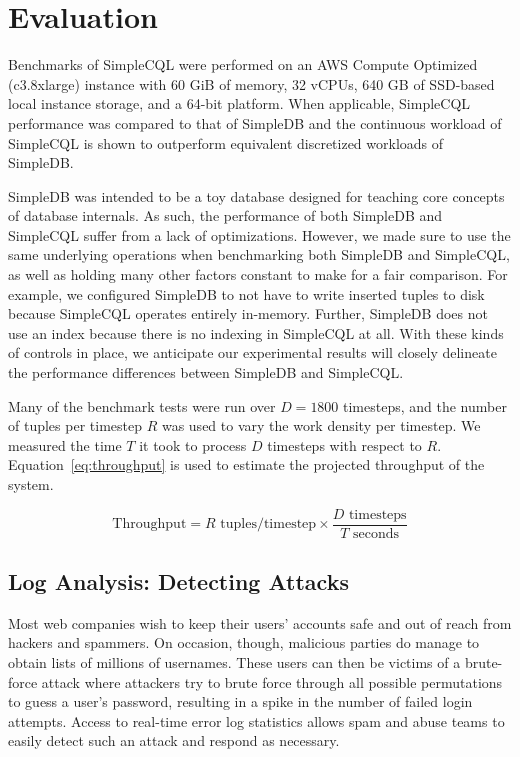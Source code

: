 \documentclass[a4paper, 10pt, conference]{IEEEconf}
\begin{document}
\section{Evaluation}
Benchmarks of SimpleCQL were performed on an AWS Compute Optimized (c3.8xlarge) instance with 60 GiB of memory, 32 vCPUs, 640 GB of SSD-based local instance storage, and a 64-bit platform.  When applicable, SimpleCQL performance was compared to that of SimpleDB and the continuous workload of SimpleCQL is shown to outperform equivalent discretized workloads of SimpleDB.  

SimpleDB was intended to be a toy database designed for teaching core concepts of database internals.  As such, the performance of both SimpleDB and SimpleCQL suffer from a lack of optimizations.  However, we made sure to use the same underlying operations when benchmarking both SimpleDB and SimpleCQL, as well as holding many other factors constant to make for a fair comparison. For example, we configured SimpleDB to not have to write inserted tuples to disk because SimpleCQL operates entirely in-memory. Further, SimpleDB does not use an index because there is no indexing in SimpleCQL at all. With these kinds of controls in place, we anticipate our experimental results will closely delineate the performance differences between SimpleDB and SimpleCQL.

Many of the benchmark tests were run over $D = 1800$ timesteps, and the number of tuples per timestep $R$ was used to vary the work density per timestep.  We measured the time $T$ it took to process $D$ timesteps with respect to $R$.  Equation~\ref{eq:throughput} is used to estimate the projected throughput of the system.

$$
    \text{Throughput} = R \text{ tuples/timestep} \times \dfrac{D \text{ timesteps}}{T \text{ seconds}}
$$

\subsection{Log Analysis: Detecting Attacks}
Most web companies wish to keep their users' accounts safe and out of reach from hackers and spammers.  On occasion, though, malicious parties do manage to obtain lists of millions of usernames.  These users can then be victims of a brute-force attack where attackers try to brute force through all possible permutations to guess a user's password, resulting in a spike in the number of failed login attempts. Access to real-time error log statistics allows spam and abuse teams to easily detect such an attack and respond as necessary.
\end{document}
